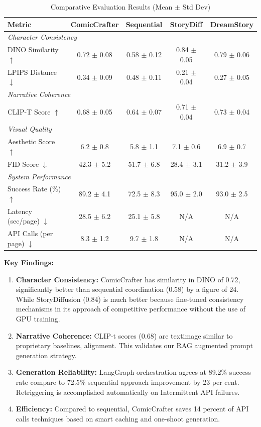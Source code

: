 \documentclass[runningheads]{llncs}
\begin{document}
\begin{table}[t]
\centering
\caption{Comparative Evaluation Results (Mean $\pm$ Std Dev)}
\label{tab:main_results}
\begin{tabular}{lcccc}
\toprule
\textbf{Metric} & \textbf{ComicCrafter} & \textbf{Sequential} & \textbf{StoryDiff} & \textbf{DreamStory} \\
\midrule
\multicolumn{5}{l}{\textit{Character Consistency}} \\
DINO Similarity $\uparrow$ & 0.72 $\pm$ 0.08 & 0.58 $\pm$ 0.12 & 0.84 $\pm$ 0.05 & 0.79 $\pm$ 0.06 \\
LPIPS Distance $\downarrow$ & 0.34 $\pm$ 0.09 & 0.48 $\pm$ 0.11 & 0.21 $\pm$ 0.04 & 0.27 $\pm$ 0.05 \\
\midrule
\multicolumn{5}{l}{\textit{Narrative Coherence}} \\
CLIP-T Score $\uparrow$ & 0.68 $\pm$ 0.05 & 0.64 $\pm$ 0.07 & 0.71 $\pm$ 0.04 & 0.73 $\pm$ 0.04 \\
\midrule
\multicolumn{5}{l}{\textit{Visual Quality}} \\
Aesthetic Score $\uparrow$ & 6.2 $\pm$ 0.8 & 5.8 $\pm$ 1.1 & 7.1 $\pm$ 0.6 & 6.9 $\pm$ 0.7 \\
FID Score $\downarrow$ & 42.3 $\pm$ 5.2 & 51.7 $\pm$ 6.8 & 28.4 $\pm$ 3.1 & 31.2 $\pm$ 3.9 \\
\midrule
\multicolumn{5}{l}{\textit{System Performance}} \\
Success Rate (\%) $\uparrow$ & 89.2 $\pm$ 4.1 & 72.5 $\pm$ 8.3 & 95.0 $\pm$ 2.0 & 93.0 $\pm$ 2.5 \\
Latency (sec/page) $\downarrow$ & 28.5 $\pm$ 6.2 & 25.1 $\pm$ 5.8 & N/A & N/A \\
API Calls (per page) $\downarrow$ & 8.3 $\pm$ 1.2 & 9.7 $\pm$ 1.8 & N/A & N/A \\
\bottomrule
\end{tabular}
\end{table}

\textbf{Key Findings:}
\begin{enumerate}
\item \textbf{Character Consistency:} ComicCrafter has similarity in DINO of 0.72, significantly better than sequential coordination (0.58) by a figure of 24. While StoryDiffusion (0.84) is much better because fine-tuned consistency mechanisms in its approach of competitive performance without the use of GPU training.

\item \textbf{Narrative Coherence:} CLIP-t scores (0.68) are textimage similar to proprietary baselines, alignment. This validates our RAG augmented prompt generation strategy.

\item \textbf{Generation Reliability:} LangGraph orchestration agrees at 89.2\% success rate compare to 72.5\% sequential approach improvement by 23 per cent. Retriggering is accomplished automatically on Intermittent API failures.

\item \textbf{Efficiency:} Compared to sequential, ComicCrafter saves 14 percent of API calls techniques based on smart caching and one-shoot generation.
\end{enumerate}
\end{document}
